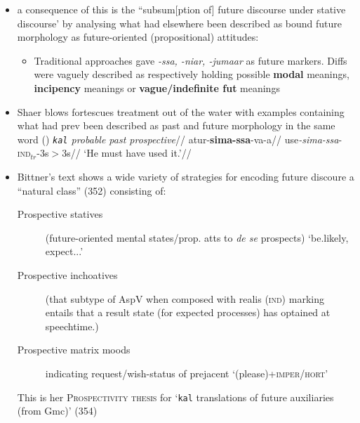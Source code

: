 \documentclass[10pt]{article}
\begin{document}
\begin{itemize}
	\item  a consequence of this is the ``subsum[ption of] future discourse under stative discourse' by analysing what had elsewhere been described as bound future morphology as future-oriented (propositional) attitudes:
	
	\begin{itemize}
		\item Traditional approaches gave \textit{-ssa, -niar, -jumaar} as future markers. Diffs were vaguely described as respectively holding possible \textbf{modal} meanings, \textbf{incipency} meanings or \textbf{vague/indefinite fut} meanings
	\end{itemize}
\item Shaer blows fortescues treatment out of the water with examples containing what had prev been described as past and future morphology in the same word (\nextx)
\pex\begingl\glpreamble \textit{\texttt{kal} probable past prospective}//
 \gla atur-\textbf{sima-ssa}-va-a//
 \glb use\textit{-sima-ssa}-\textsc{ind$_{tr}$}-3s$>$3s//
 \glft`He must have used it.'//
 \endgl\xe

\item Bittner's text shows a wide variety of strategies for encoding future discoure a ``natural class'' (352) consisting of:
\begin{description}
\item[Prospective statives]  (future-oriented mental states/prop. atts to \textit{de se} prospects) `be.likely, expect...'
\item[Prospective inchoatives] (that subtype of AspV when composed with realis \textsc{(ind)} marking entails that a result state (for expected processes) has optained at speechtime.) 
\item[Prospective matrix moods] indicating request/wish-status of prejacent `(please)+\textsc{imper/hort}'
\end{description}
This is her \textsc{Prospectivity thesis} for `\texttt{kal} translations of future auxiliaries (from Gmc)' (354)


\end{itemize}
\end{document}
